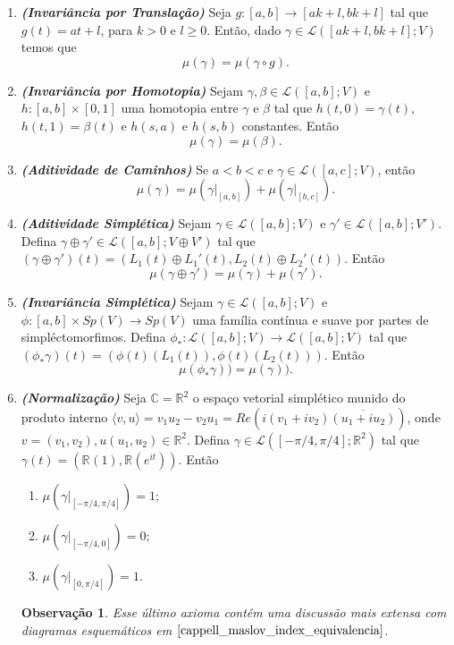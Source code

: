 \documentclass[12pt]{book}
\newtheorem{observacao}[teorema]{Observação}
\newcommand{\caminhos}[3]{\mathcal{L}([#1, #2]; #3)}
\newcommand{\gruposimpletico}[1]{Sp(#1)}
\newcommand{\iprod}[2]{\langle #1, #2 \rangle}
\newcommand{\real}[1]{\mathbb{R}^{#1}}
\newcommand{\reta}{\real{}}
\begin{document}
	\begin{enumerate}
		\item \textbf{\textit{(Invariância por Translação)}} Seja $g: [a,b] \to [ak+l, bk+l]$ tal que $g(t)=at+l$, para $k>0$ e $l\geq 0$. Então, dado $\gamma\in \caminhos{ak+l}{bk+l}{V}$ temos que 
		$$
			\mu(\gamma) = \mu(\gamma\circ g).
		$$
		\item \textbf{\textit{(Invariância por Homotopia)}} Sejam $\gamma, \beta \in \caminhos{a}{b}{V}$ e $h:[a,b] \times [0,1]$ uma homotopia entre $\gamma$ e $\beta$ tal que $h(t,0)= \gamma(t)$, $h(t,1) = \beta(t)$ e $h(s, a)$ e $h(s, b)$ constantes. Então
		$$
			\mu(\gamma) = \mu(\beta).
		$$
		\item \textbf{\textit{(Aditividade de Caminhos)}} Se $a<b<c$ e $\gamma \in \caminhos{a}{c}{V}$, então $$
			\mu(\gamma)=\mu(\gamma|_{[a,b]})+\mu(\gamma|_{[b,c]}).
		$$
		\item \textbf{\textit{(Aditividade Simplética)}} Sejam $\gamma \in \caminhos{a}{b}{V}$ e $\gamma' \in \caminhos{a}{b}{V'}$. Defina $\gamma\oplus\gamma' \in \caminhos{a}{b}{V\oplus V'}$ tal que $(\gamma\oplus\gamma' )(t) = (L_{1}(t)\oplus L_{1}'(t), L_{2}(t)\oplus L_{2}'(t))$. Então 
		$$
			\mu(\gamma\oplus\gamma' )= \mu(\gamma)+\mu(\gamma' ).
		$$
		\item \textbf{\textit{(Invariância Simplética)}} Sejam $\gamma \in \caminhos{a}{b}{V}$ e $\phi:[a,b]\times \gruposimpletico{V} \to \gruposimpletico{V}$ uma família contínua e suave por partes de simpléctomorfimos. Defina $\phi_{*}:\caminhos{a}{b}{V}\to \caminhos{a}{b}{V}$ tal que $ (\phi_{*}\gamma)(t) = (\phi(t)(L_{1}(t)), \phi(t)(L_{2}(t)))$. Então 
		$$
			\mu(\phi_{*}\gamma)) = \mu(\gamma)).
		$$
		\item \textbf{\textit{(Normalização)}} Seja $\mathbb{C} = \real{2}$ o espaço vetorial simplético munido do produto interno $\iprod{v}{u} = v_{1}u_{2}- v_{2}u_{1} = Re(i(v_{1}+iv_{2})\overline{(u_{1}+iu_{2})})$, onde $v=(v_{1},v_{2}),u (u_{1},u_{2})\in \real{2}$. Defina $\gamma \in \caminhos{-\pi/4}{\pi/4}{\real{2}}$ tal que $\gamma(t) = (\reta(1), \reta(e^{it}))$. Então
			\begin{enumerate}
				\item $\mu(\gamma|_{[-\pi/4, \pi/4]}) = 1;$
				\item $\mu(\gamma|_{[-\pi/4, 0]}) = 0;$
				\item $\mu(\gamma|_{[0, \pi/4]}) = 1.$	
			\end{enumerate}
			\begin{observacao}
				Esse último axioma contém uma discussão mais extensa com diagramas esquemáticos em $\cite{cappell_maslov_index_equivalencia}$.
			\end{observacao}
	\end{enumerate}
	
\end{document}
